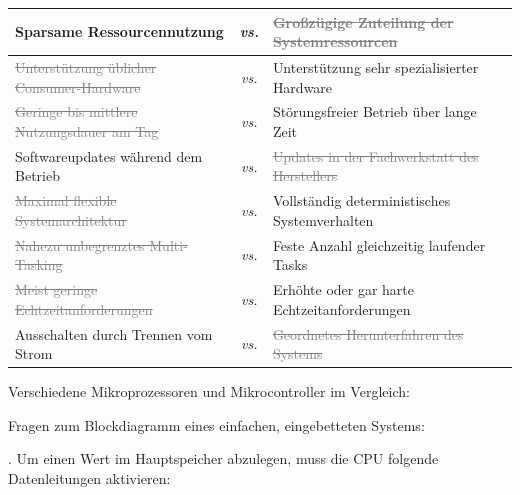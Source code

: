 \begin{longtable}{|p{} c p{}|}
    \hline
    Sparsame Ressourcennutzung
    & \textit{vs.} &
    \textcolor{gray}{\sout{Großzügige Zuteilung der Systemressourcen}}
    \\

    \hline
    \textcolor{gray}{\sout{Unterstützung üblicher Consumer-Hardware}}
    & \textit{vs.} &
    Unterstützung sehr spezialisierter Hardware
    \\

    \hline
    \textcolor{gray}{\sout{Geringe bis mittlere Nutzungsdauer am Tag}}
    & \textit{vs.} &
    Störungsfreier Betrieb über lange Zeit
    \\

    \hline
    Softwareupdates während dem Betrieb
    & \textit{vs.} &
    \textcolor{gray}{\sout{Updates in der Fachwerkstatt des Herstellers}}
    \\

    \hline
    \textcolor{gray}{\sout{Maximal flexible Systemarchitektur}}
    & \textit{vs.} &
    Vollständig deterministisches Systemverhalten
    \\

    \hline
    \textcolor{gray}{\sout{Nahezu unbegrenztes Multi-Tasking}}
    & \textit{vs.} &
    Feste Anzahl gleichzeitig laufender Tasks
    \\

    \hline
    \textcolor{gray}{\sout{Meist geringe Echtzeitanforderungen}}
    & \textit{vs.} &
    Erhöhte oder gar harte Echtzeitanforderungen
    \\

    \hline
    Ausschalten durch Trennen vom Strom
    & \textit{vs.} &
    \textcolor{gray}{\sout{Geordnetes Herunterfahren des Systems}}
    \\

    \hline
\end{longtable}

\teilaufgabe
Verschiedene Mikroprozessoren und Mikrocontroller im Vergleich:

\teilaufgabe
Fragen zum Blockdiagramm eines einfachen, eingebetteten Systems:

. Um einen Wert im Hauptspeicher abzulegen, muss die CPU folgende Datenleitungen
aktivieren:

